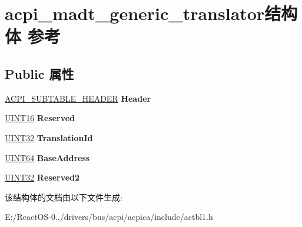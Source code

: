 \hypertarget{structacpi__madt__generic__translator}{}\section{acpi\+\_\+madt\+\_\+generic\+\_\+translator结构体 参考}
\label{structacpi__madt__generic__translator}
\subsection*{Public 属性}
\begin{DoxyCompactItemize}
\item 
\mbox{\label{structacpi__madt__generic__translator_a0724fa404eae70ebc5d85b46c4b0de03}} 
\hyperlink{structacpi__subtable__header}{A\+C\+P\+I\+\_\+\+S\+U\+B\+T\+A\+B\+L\+E\+\_\+\+H\+E\+A\+D\+ER} {\bfseries Header}
\item 
\mbox{\label{structacpi__madt__generic__translator_a336c3c6e7c53e69ec811a33b9ee71748}} 
\hyperlink{_processor_bind_8h_a09f1a1fb2293e33483cc8d44aefb1eb1}{U\+I\+N\+T16} {\bfseries Reserved}
\item 
\mbox{\label{structacpi__madt__generic__translator_ae379eb9d18de0909f9d663c63b85757d}} 
\hyperlink{_processor_bind_8h_ae1e6edbbc26d6fbc71a90190d0266018}{U\+I\+N\+T32} {\bfseries Translation\+Id}
\item 
\mbox{\label{structacpi__madt__generic__translator_a19badeedcb25db68e0a4ea0338d0fa08}} 
\hyperlink{_processor_bind_8h_a57be03562867144161c1bfee95ca8f7c}{U\+I\+N\+T64} {\bfseries Base\+Address}
\item 
\mbox{\label{structacpi__madt__generic__translator_a488efd269f0db32a29d758c85845928a}} 
\hyperlink{_processor_bind_8h_ae1e6edbbc26d6fbc71a90190d0266018}{U\+I\+N\+T32} {\bfseries Reserved2}
\end{DoxyCompactItemize}


该结构体的文档由以下文件生成\+:\begin{DoxyCompactItemize}
\item 
E\+:/\+React\+O\+S-\/0../drivers/bus/acpi/acpica/include/actbl1.\+h\end{DoxyCompactItemize}
